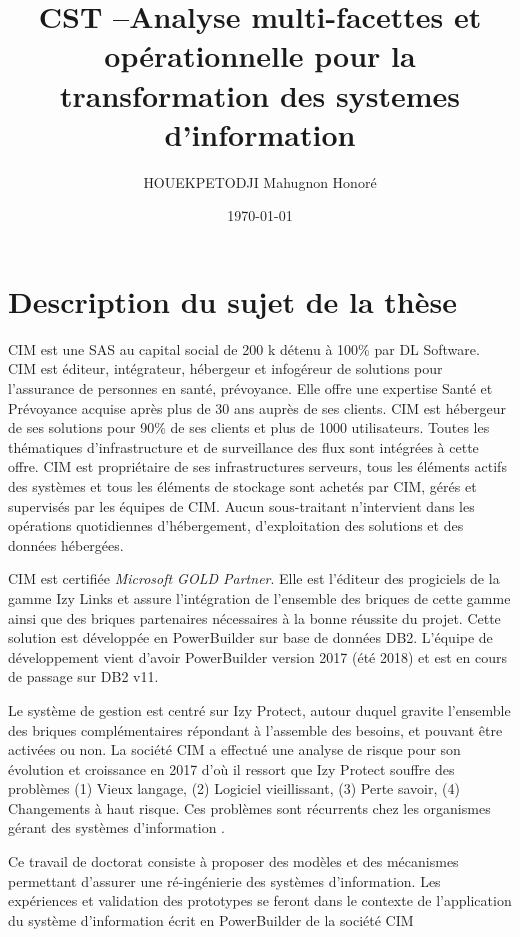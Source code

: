 \documentclass[a4paper]{article}
\title{CST --Analyse multi-facettes et opérationnelle pour la transformation des systemes d’information}
\author{ HOUEKPETODJI Mahugnon Honoré}
\begin{document}
\institution{}

\date{\today}

\maketitle

\section{Description du sujet de la thèse}
CIM est une SAS au capital social de 200 k détenu à 100\% par DL Software. 
CIM est éditeur, intégrateur, hébergeur et infogéreur de solutions pour l'assurance de personnes en santé, prévoyance. 
Elle offre une expertise Santé et Prévoyance acquise après plus de 30 ans auprès de ses clients. 
CIM est hébergeur de ses solutions pour 90\% de ses clients et plus de 1000 utilisateurs. 
Toutes les thématiques d'infrastructure et de surveillance des flux sont intégrées à cette offre.
CIM est propriétaire de ses infrastructures serveurs, tous les éléments actifs des systèmes et tous les éléments de stockage sont achetés par CIM, gérés et supervisés par les équipes de CIM. Aucun sous-traitant n'intervient dans les opérations quotidiennes d'hébergement, d'exploitation des solutions et des données hébergées.

CIM est certifiée \textit{Microsoft GOLD Partner}. 
Elle est l'éditeur des progiciels de la gamme Izy Links et assure l'intégration de l'ensemble des briques de cette gamme ainsi que des briques partenaires nécessaires à la bonne réussite du projet. Cette solution est développée en PowerBuilder sur base de données DB2.
L'équipe de développement vient d'avoir PowerBuilder version 2017 (été 2018) et est en cours de passage sur DB2 v11.

Le système de gestion est centré sur Izy Protect, autour duquel gravite l'ensemble des briques complémentaires répondant à l'assemble des besoins, et pouvant être activées ou non. 
La société CIM a effectué une analyse de risque pour son évolution et croissance en 2017 d'où il ressort que Izy Protect souffre des problèmes 
(1) Vieux langage,
(2) Logiciel vieillissant,
(3) Perte savoir,
(4) Changements à haut risque.
Ces problèmes sont récurrents chez les organismes gérant des systèmes d'information \cite{Deme02a}.

Ce travail de doctorat consiste à proposer des modèles et des mécanismes permettant d'assurer une ré-ingénierie des systèmes d'information. 
Les expériences et validation des prototypes se feront dans le contexte de l'application du système d'information écrit en PowerBuilder de la société CIM
\end{document}
